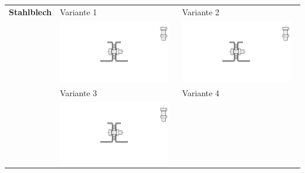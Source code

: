 \begin{longtable}{l p{6.55cm} p{6.55cm}}
         \textbf{Stahlblech} & Variante 1 & Variante 2 \\ \nopagebreak
         & \noindent\begin{minipage}{6.5cm}
                \includegraphics[page=1, width=0.95\textwidth, trim = 12cm 5.5cm 12cm 5.5cm, clip]{Abbildungen/Kapitel3/Konzepte.pdf}
        \end{minipage} &
        \noindent\begin{minipage}{6.5cm}
                \includegraphics[page=2, width=0.95\textwidth, trim = 12cm 5.5cm 12cm 5.5cm, clip]{Abbildungen/Kapitel3/Konzepte.pdf}
        \end{minipage} \\
         & Variante 3 & Variante 4 \\ \nopagebreak
         & \noindent\begin{minipage}{6.5cm}
                \includegraphics[page=3, width=0.95\textwidth, trim = 12cm 5.5cm 12cm 6.5cm, clip]{Abbildungen/Kapitel3/Konzepte.pdf}

\end{minipage}
\end{longtable}
